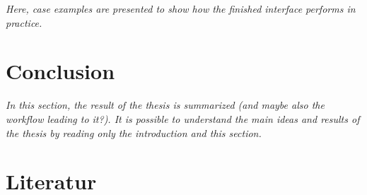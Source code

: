 \documentclass{article}
\begin{document}
\textit{Here, case examples are presented to show how the finished interface performs in practice.}

\section {Conclusion}

\textit{In this section, the result of the thesis is summarized (and maybe also the workflow leading to it?). It is possible to understand the main ideas and results of the thesis by reading only the introduction and this section.}

\listoffigures
        
\section{Literatur}



\end{document}
